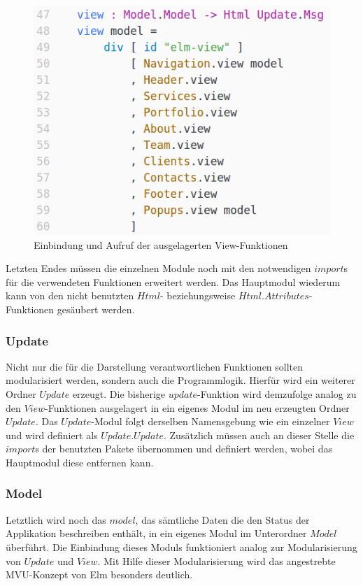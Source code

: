 \begin{figure}[hbt]
\centering
\includegraphics[scale=0.6]{img/view-main.png}
\caption{Einbindung und Aufruf der ausgelagerten View-Funktionen}\label{fig:elm-main-view}
\end{figure}
Letzten Endes müssen die einzelnen Module noch mit den notwendigen $import$s für die verwendeten Funktionen erweitert werden. Das Hauptmodul wiederum kann von den nicht benutzten $Html$- beziehungsweise $Html.Attributes$-Funktionen gesäubert werden.

\subsubsection{Update}
\label{sec:auslagern-update}
Nicht nur die für die Darstellung verantwortlichen Funktionen sollten modularisiert werden, sondern auch die Programmlogik. Hierfür wird ein weiterer Ordner $Update$ erzeugt. Die bisherige $update$-Funktion wird demzufolge analog zu den $View$-Funktionen ausgelagert in ein eigenes Modul im neu erzeugten Ordner $Update$. Das $Update$-Modul folgt derselben Namensgebung wie ein einzelner $View$ und wird definiert als $Update.Update$. Zusätzlich müssen auch an dieser Stelle die $import$s der benutzten Pakete übernommen und definiert werden, wobei das Hauptmodul diese entfernen kann.

\subsubsection{Model}
\label{sec:auslagern-Model}
Letztlich wird noch das $model$, das sämtliche Daten die den Status der Applikation beschreiben enthält, in ein eigenes Modul im Unterordner $Model$ überführt. Die Einbindung dieses Moduls funktioniert analog zur Modularisierung von $Update$ und $View$.
Mit Hilfe dieser Modularisierung wird das angestrebte \ac{MVU}-Konzept von Elm besonders deutlich.



